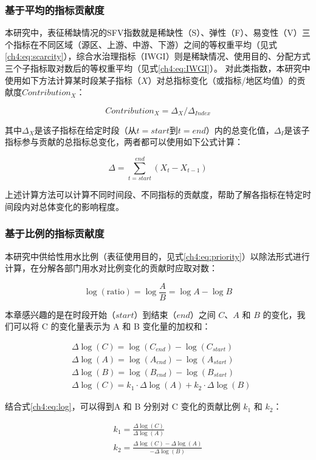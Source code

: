 \subsubsection{基于平均的指标贡献度}

本研究中，表征稀缺情况的SFV指数就是稀缺性（S）、弹性（F）、易变性（V）三个指标在不同区域（源区、上游、中游、下游）之间的等权重平均（见式\ref{ch4:eq:scarcity}），综合水治理指标（IWGI）则是稀缺情况、使用目的、分配方式三个子指标取对数后的等权重平均（见式\ref{ch4:eq:IWGI}）。
对此类指数，本研究中使用如下方法计算某时段某子指标（$X$）对总指标变化（或指标/地区均值）的贡献度$Contribution_{X}$：

\begin{equation}
    Contribution_{X} = \Delta_{X} / \Delta_{Index}
\end{equation}

其中$\Delta_{X}$是该子指标在给定时段（从$t=start$到$t=end$）内的总变化值，$\Delta_{I}$是该子指标参与贡献的总指标总变化，两者都可以使用如下公式计算：

\begin{equation}
    \Delta=\sum_{t=start}^{end}(X_{t}-X_{t-1})
\end{equation}

上述计算方法可以计算不同时间段、不同指标的贡献度，帮助了解各指标在特定时间段内对总体变化的影响程度。

\subsubsection{基于比例的指标贡献度}

本研究中供给性用水比例（表征使用目的，见式\ref{ch4:eq:priority}）以除法形式进行计算，在分解各部门用水对比例变化的贡献时应取对数：

\begin{equation}
    \log{(\text{ratio})}=\log{\frac{A}{B}} = \log{A} - \log{B}
    \label{ch4:eq:log}
\end{equation}

本章感兴趣的是在时段开始（$start$）到结束（$end$）之间 $C$、$A$ 和 $B$ 的变化，我们可以将 C 的变化量表示为 A 和 B 变化量的加权和：

\begin{equation}
    \begin{aligned}
    & \Delta \log (C)=\log \left(C_{end}\right)-\log \left(C_{start}\right) \\
    & \Delta \log (A)=\log \left(A_{end}\right)-\log \left(A_{start}\right) \\
    & \Delta \log (B)=\log \left(B_{end}\right)-\log \left(B_{start}\right) \\
    & \Delta \log (C)=k_1 \cdot \Delta \log (A)+k_2 \cdot \Delta \log (B)
    \end{aligned}
\end{equation}

结合式\ref{ch4:eq:log}，可以得到A 和 B 分别对 C 变化的贡献比例 $k_1$ 和 $k_2$：

\begin{equation}
    \begin{gathered}
    k_1=\frac{\Delta \log (C)}{\Delta \log (A)} \\
    k_2=\frac{\Delta \log (C)-\Delta \log (A)}{-\Delta \log (B)}
    \end{gathered}
\end{equation}
